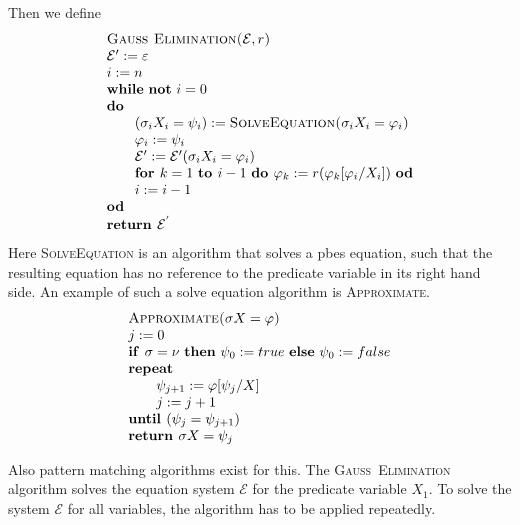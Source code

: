 \documentclass{article}
\begin{document}
Then we define%
\begin{equation*}
\begin{array}{l}
\text{\textsc{Gau\textsc{\ss\ }Elimination(}}\mathcal{E},r\text{\textsc{)}}
\\
\mathcal{E}^{\prime }:=\varepsilon \\
i:=n \\
\text{\textbf{while} \textbf{not} }i=0 \\
\text{\textbf{do}} \\
\qquad (\sigma _{i}X_{i}=\psi _{i}):=\text{\textsc{SolveEquation(}}\sigma
_{i}X_{i}=\varphi _{i}\text{\textsc{)}} \\
\qquad \varphi _{i}:=\psi _{i} \\
\qquad \mathcal{E}^{\prime }:=\mathcal{E}^{\prime }(\sigma _{i}X_{i}=\varphi
_{i}) \\
\qquad \text{\textbf{for }}k=1\text{ \textbf{to }}i-1\text{ \textbf{do }}%
\varphi _{k}:=r(\varphi _{k}[\varphi _{i}/X_{i}])\text{ \textbf{od}} \\
\qquad i:=i-1 \\
\text{\textbf{od}} \\
\text{\textbf{return }}\mathcal{E}^{^{\prime }}%
\end{array}%
\end{equation*}%
Here \textsc{SolveEquation} is an algorithm that solves a pbes equation,
such that the resulting equation has no reference to the predicate variable
in its right hand side. An example of such a solve equation algorithm is
\textsc{Approximate}.%
\begin{equation*}
\begin{array}{l}
\text{\textsc{Approximate(}}\sigma X=\varphi \text{\textsc{)}} \\
j:=0 \\
\text{\textbf{if }}\sigma =\nu \text{ \textbf{then} }\psi _{0}:=true \text{
\textbf{else} }\psi _{0}:=false \\
\text{\textbf{repeat}} \\
\qquad \psi _{j+1}:=\varphi \lbrack \psi _{j}/X] \\
\qquad j:=j+1 \\
\text{\textbf{until }}(\psi _{j}=\psi _{j+1}) \\
\text{\textbf{return }}\sigma X=\psi _{j}%
\end{array}%
\end{equation*}

Also pattern matching algorithms exist for this. The \textsc{Gau\textsc{\ss\
}Elimination} algorithm solves the equation system $\mathcal{E}$ for the
predicate variable $X_{1}$. To solve the system $\mathcal{E}$ for all
variables, the algorithm has to be applied repeatedly.
\end{document}
